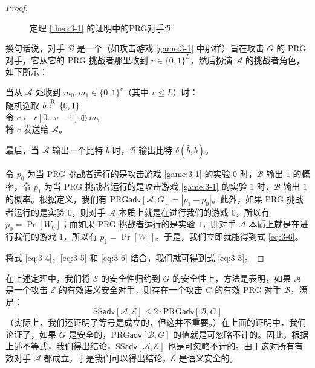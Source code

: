 \begin{proof}
\begin{figure}
	\centering
	
	\caption{定理 \ref{theo:3-1} 的证明中的PRG对手$\mathcal{B}$}
	\label{fig:3-4}
\end{figure}

换句话说，对手 $\mathcal B$ 是一个（如攻击游戏 \ref{game:3-1} 中那样）旨在攻击 $G$ 的 PRG 对手，它从它的 PRG 挑战者那里收到 $r\in\{0,1\}^L$，然后扮演 $\mathcal A$ 的挑战者角色，如下所示：

\vspace*{10pt}

\hspace*{5pt} 当从 $\mathcal A$ 处收到 $m_0,m_1\in\{0,1\}^v$（其中 $v\leq L$）时：\\
\hspace*{50pt} 随机选取 $b\overset{\rm R}\leftarrow\{0,1\}$\\
\hspace*{50pt} 令 $c\leftarrow r[0\dots v-1]\oplus m_b$\\
\hspace*{50pt} 将 $c$ 发送给 $\mathcal A$。

\vspace*{10pt}

\noindent
最后，当 $\mathcal A$ 输出一个比特 $\hat b$ 时，$\mathcal B$ 输出比特 $\delta(\hat b,b)$。

令 $p_0$ 为当 PRG 挑战者运行的是攻击游戏 \ref{game:3-1} 的实验 $0$ 时，$\mathcal B$ 输出 $1$ 的概率，令 $p_1$ 为当 PRG 挑战者运行的是攻击游戏 \ref{game:3-1} 的实验 $1$ 时，$\mathcal B$ 输出 $1$ 的概率。根据定义，我们有 $\mathrm{PRG}\mathsf{adv}[\mathcal{A},G]=|p_1-p_0|$。此外，如果 PRG 挑战者运行的是实验 $0$，则对手 $\mathcal A$ 本质上就是在进行我们的游戏 $0$，所以有 $p_0=\Pr[W_0]$；而如果 PRG 挑战者运行的是实验 $1$，则对手 $\mathcal A$ 本质上就是在进行我们的游戏 $1$，所以有 $p_1=\Pr[W_1]$。于是，我们立即就能得到式 \ref{eq:3-6}。

将式 \ref{eq:3-4}，\ref{eq:3-5} 和 \ref{eq:3-6} 结合，我们就可得到式 \ref{eq:3-3}。
\end{proof}

在上述定理中，我们将 $\mathcal E$ 的安全性归约到 $G$ 的安全性上，方法是表明，如果 $\mathcal A$ 是一个攻击 $\mathcal E$ 的有效语义安全对手，则存在一个攻击 $G$ 的有效 PRG 对手 $\mathcal B$，满足：
\[
\mathrm{SS}\mathsf{adv}[\mathcal{A},\mathcal{E}]
\leq2\cdot
\mathrm{PRG}\mathsf{adv}[\mathcal{B},G]
\]
（实际上，我们还证明了等号是成立的，但这并不重要。）在上面的证明中，我们论证了，如果 $G$ 是安全的，$\mathrm{PRG}\mathsf{adv}[\mathcal{B},G]$ 的值就是可忽略不计的。因此，根据上述不等式，我们得出结论，$\mathrm{SS}\mathsf{adv}[\mathcal{A},\mathcal{E}]$ 也是可忽略不计的。由于这对所有有效对手 $\mathcal A$ 都成立，于是我们可以得出结论，$\mathcal E$ 是语义安全的。

